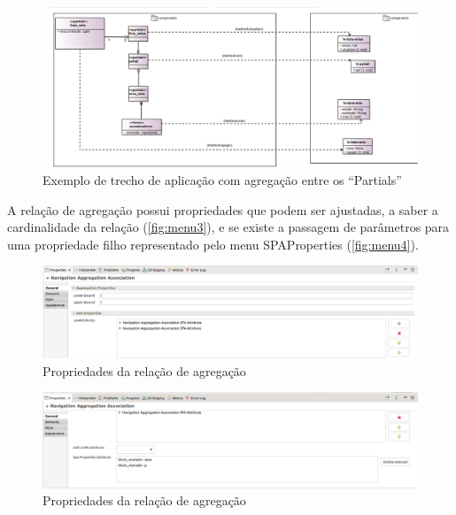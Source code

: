 \documentclass[
article,			%
11pt,				%
oneside,			%
a4paper,			%
english,			%
brazil,				%
sumario=tradicional
]{abntex2}
\begin{document}
\begin{figure}
	\centering
	\includegraphics[width=0.7\linewidth]{figuras/Partial3}
	\caption{Exemplo de trecho de aplicação com agregação entre os ``Partials''}
	\label{fig:partial3}
\end{figure}

A relação de agregação possui propriedades que podem ser ajustadas, a saber a cardinalidade da relação (\autoref{fig:menu3}), e se existe a passagem de parâmetros para uma propriedade filho representado pelo menu SPAProperties (\autoref{fig:menu4}).

\begin{figure}
	\centering
	\includegraphics[width=0.7\linewidth]{figuras/menu3}
	\caption{Propriedades da relação de agregação}
	\label{fig:menu3}
\end{figure}

\begin{figure}
	\centering
	\includegraphics[width=0.7\linewidth]{figuras/menu4}
	\caption{Propriedades da relação de agregação}
	\label{fig:menu4}
\end{figure}



\end{document}
